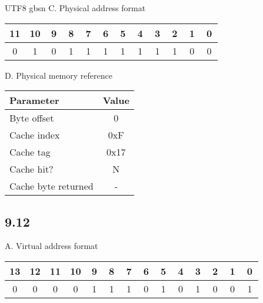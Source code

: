 \documentclass {article}
\begin{document}
\begin {CJK*} {UTF8} {gbsn}
				C. Physical address format
				\begin{table}[!htbp]
					\begin{tabular}{cccccccccccc}
						11                     & 10                     & 9                      & 8                      & 7                      & 6                      & 5                      & 4                      & 3                      & 2                      & 1                      & 0                      \\ \hline
						\multicolumn{1}{|c|}{\,0\,} & \multicolumn{1}{c|}{\,1\,} & \multicolumn{1}{c|}{\,0\,} & \multicolumn{1}{c|}{\,1\,} & \multicolumn{1}{c|}{\,1\,} & \multicolumn{1}{c|}{\,1\,} & \multicolumn{1}{c|}{\,1\,} & \multicolumn{1}{c|}{\,1\,} & \multicolumn{1}{c|}{\,1\,} & \multicolumn{1}{c|}{\,1\,} & \multicolumn{1}{c|}{\,0\,} & \multicolumn{1}{c|}{\,0\,} \\ \hline
					\end{tabular}
				\end{table}

				D. Physical memory reference
				\begin{table}[!htbp]
					\begin{tabular}{lc}
						Parameter           & Value \\ \hline
						Byte offset         & 0     \\
						Cache index         & 0xF   \\
						Cache tag           & 0x17  \\
						Cache hit?          & N     \\
						Cache byte returned & -    
					\end{tabular}
				\end{table}

			\newpage

			\subsection{9.12}
				A. Virtual address format
				\begin{table}[!htbp]
					\begin{tabular}{cccccccccccccc}
						13                      & 12                     & 11                     & 10                     & 9                      & 8                      & 7                      & 6                      & 5                      & 4                      & 3                      & 2                      & 1                      & 0                      \\ \hline
						\multicolumn{1}{|c|}{\,0\,} & \multicolumn{1}{c|}{\,0\,} & \multicolumn{1}{c|}{\,0\,} & \multicolumn{1}{c|}{\,0\,} & \multicolumn{1}{c|}{\,1\,} & \multicolumn{1}{c|}{\,1\,} & \multicolumn{1}{c|}{\,1\,} & \multicolumn{1}{c|}{\,0\,} & \multicolumn{1}{c|}{\,1\,} & \multicolumn{1}{c|}{\,0\,} & \multicolumn{1}{c|}{\,1\,} & \multicolumn{1}{c|}{\,0\,} & \multicolumn{1}{c|}{\,0\,} & \multicolumn{1}{c|}{\,1\,} \\ \hline
					\end{tabular}
				\end{table}


\end{CJK*}
\end{document}
